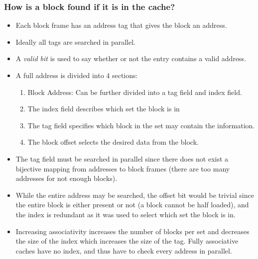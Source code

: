\subsubsection{How is a block found if it is in the cache?}
\begin{itemize}
  \item Each block frame has an address tag that gives the block an address. 
  \item Ideally all tags are searched in parallel.
  \item A \textit{valid bit} is used to say whether or not the entry contains a valid address. 
  \item A full address is divided into 4 sections:
  \begin{enumerate}
    \item Block Address: Can be further divided into a tag field and index field.
    \item The index field describes which set the block is in 
    \item The tag field specifies which block in the set may contain the information.
    \item The block offset selects the desired data from the block.
  \end{enumerate}
  \item The tag field must be searched in parallel since there does not exist a bijective mapping from addresses to block frames (there are too many addresses for not enough blocks).
  \item While the entire address may be searched, the offset bit would be trivial since the entire block is either present or not (a block cannot be half loaded), and the index is redundant as it was used to select which set the block is in.
  \item Increasing associativity increases the number of blocks per set and decreases the size of the index which increases the size of the tag. Fully associative caches have no index, and thus have to check every address in parallel.
\end{itemize}
